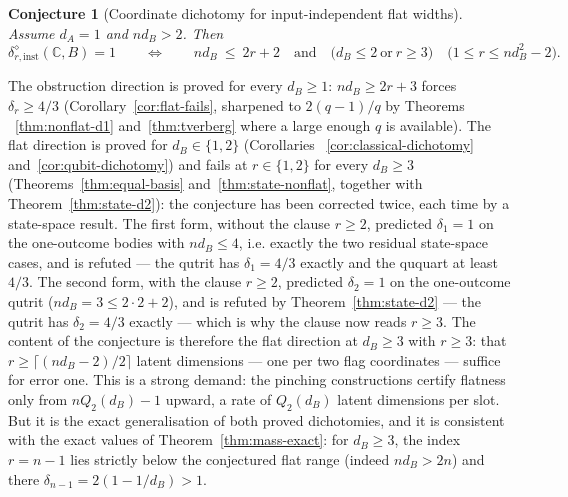 \documentclass[11pt,a4paper]{article}
\newtheorem{conjecture}[theorem]{Conjecture}
\begin{document}
\begin{conjecture}[Coordinate dichotomy for input-independent flat widths]
\label{con:coord-flat}
Assume $d_A=1$ and $nd_B>2$. Then
\[
\delta_{r,\mathrm{inst}}^{\diamond}(\mathbb C,B)=1
\qquad\Longleftrightarrow\qquad
nd_B\ \le\ 2r+2
\quad\text{and}\quad
\bigl(d_B\le2\ \text{or}\ r\ge3\bigr) \quad\big(1\le r\le nd_B^2-2\big).
\]
\end{conjecture}

The obstruction direction is proved for every $d_B\ge1$: $nd_B\ge2r+3$ forces
$\delta_r\ge4/3$ (Corollary~\ref{cor:flat-fails}, sharpened to $2(q-1)/q$ by Theorems
~\ref{thm:nonflat-d1} and~\ref{thm:tverberg} where a large enough $q$ is available).
The flat direction is proved for $d_B\in\{1,2\}$ (Corollaries ~\ref{cor:classical-dichotomy} and~\ref{cor:qubit-dichotomy}) and fails at $r\in\{1,2\}$ for every $d_B\ge3$ (Theorems~\ref{thm:equal-basis} and~\ref{thm:state-nonflat}, together with Theorem~\ref{thm:state-d2}): the conjecture has been corrected twice, each time by a state-space result. The first form, without the clause $r\ge2$, predicted $\delta_1=1$ on the one-outcome bodies with $nd_B\le4$, i.e. exactly the two residual state-space cases, and is refuted --- the qutrit has $\delta_1=4/3$ exactly and the ququart at least $4/3$. The second form, with the clause $r\ge2$, predicted $\delta_2=1$ on the one-outcome qutrit ($nd_B=3\le2\cdot2+2$), and is refuted by Theorem~\ref{thm:state-d2} --- the qutrit has $\delta_2=4/3$ exactly --- which is why the clause now reads $r\ge3$. The content of the conjecture is therefore the flat direction at $d_B\ge3$ with $r\ge3$: that
$r\ge\lceil(nd_B-2)/2\rceil$ latent dimensions --- one per two flag coordinates ---
suffice for error one. This is a strong demand: the pinching constructions certify
flatness only from $nQ_2(d_B)-1$ upward, a rate of $Q_2(d_B)$ latent dimensions per
slot. But it is the exact generalisation of both proved dichotomies, and it is
consistent with the exact values of Theorem~\ref{thm:mass-exact}: for $d_B\ge3$, the
index $r=n-1$ lies strictly below the conjectured flat range (indeed $nd_B>2n$) and
there $\delta_{n-1}=2(1-1/d_B)>1$.
\end{document}
